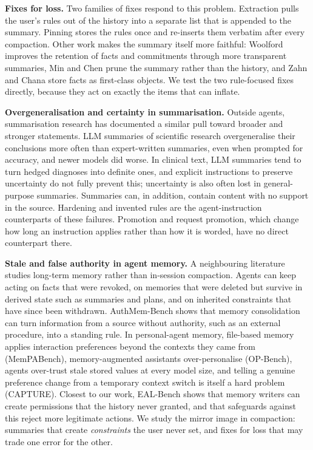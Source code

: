 \documentclass[fleqn,10pt]{wlscirep}
\begin{document}
\textbf{Fixes for loss.} Two families of fixes respond to this problem. Extraction pulls the user's rules out of the history into a separate list that is appended to the summary\cite{wang2026lost}. Pinning stores the rules once and re-inserts them verbatim after every compaction\cite{chen2026governance}. Other work makes the summary itself more faithful: Woolford\cite{woolford2026transparency} improves the retention of facts and commitments through more transparent summaries, Min and Chen\cite{min2026prune} prune the summary rather than the history, and Zahn and Chana\cite{zahn2026facts} store facts as first-class objects. We test the two rule-focused fixes directly, because they act on exactly the items that can inflate.

\textbf{Overgeneralisation and certainty in summarisation.} Outside agents, summarisation research has documented a similar pull toward broader and stronger statements. LLM summaries of scientific research overgeneralise their conclusions more often than expert-written summaries, even when prompted for accuracy, and newer models did worse\cite{peters2025generalization}. In clinical text, LLM summaries tend to turn hedged diagnoses into definite ones, and explicit instructions to preserve uncertainty do not fully prevent this\cite{possibledefinite2026}; uncertainty is also often lost in general-purpose summaries\cite{kolagar2024aligning}. Summaries can, in addition, contain content with no support in the source\cite{maynez2020faithfulness}. Hardening and invented rules are the agent-instruction counterparts of these failures. Promotion and request promotion, which change how long an instruction applies rather than how it is worded, have no direct counterpart there.

\textbf{Stale and false authority in agent memory.} A neighbouring literature studies long-term memory rather than in-session compaction. Agents can keep acting on facts that were revoked\cite{revoked2026authoritative}, on memories that were deleted but survive in derived state such as summaries and plans\cite{unlearning2026forgetting}, and on inherited constraints that have since been withdrawn\cite{nakayashiki2026stale}. AuthMem-Bench\cite{zhan2026authmem} shows that memory consolidation can turn information from a source without authority, such as an external procedure, into a standing rule. In personal-agent memory, file-based memory applies interaction preferences beyond the contexts they came from (MemPABench\cite{mempabench2026}), memory-augmented assistants over-personalise (OP-Bench\cite{opbench2026}), agents over-trust stale stored values at every model size\cite{hu2026trustgap}, and telling a genuine preference change from a temporary context switch is itself a hard problem (CAPTURE\cite{capture2026}). Closest to our work, EAL-Bench\cite{eal2026laundering} shows that memory writers can create permissions that the history never granted, and that safeguards against this reject more legitimate actions. We study the mirror image in compaction: summaries that create \emph{constraints} the user never set, and fixes for loss that may trade one error for the other.
\end{document}
